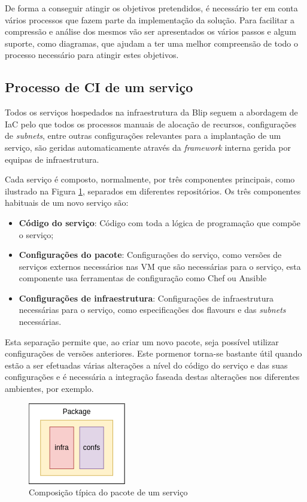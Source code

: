 De forma a conseguir atingir os objetivos pretendidos, é necessário ter em conta vários processos
que fazem parte da implementação da solução. Para facilitar a compressão e análise dos mesmos vão 
ser apresentados os vários passos e algum suporte, como diagramas, que ajudam a ter uma melhor 
compreensão de todo o processo necessário para atingir estes objetivos.

\subsection{Processo de \ac{CI} de um serviço}

Todos os serviços hospedados na infraestrutura da Blip seguem a abordagem de \ac{IaC} pelo que 
todos os processos manuais de alocação de recursos, configurações de \textit{subnets}, entre 
outras configurações relevantes para a implantação de um serviço, são geridas automaticamente
através da \textit{framework} interna gerida por equipas de infraestrutura.

Cada serviço é composto, normalmente, por três componentes principais, como ilustrado na Figura
\ref{package}, separados em diferentes repositórios. Os três componentes habituais de um novo 
serviço são: 

\begin{itemize}
  \item \textbf{Código do serviço}: Código com toda a lógica de programação que compõe o serviço;
  \item \textbf{Configurações do pacote}: Configurações do serviço, como versões de serviços 
  externos necessários nas \ac{VM} que são necessárias para o serviço, esta componente usa 
ferramentas de configuração como Chef \cite{chef} ou Ansible \cite{ansible} 
  \item \textbf{Configurações de infraestrutura}: Configurações de infraestrutura necessárias para 
    o serviço, como especificações dos \glspl{flavour} e das \textit{subnets} necessárias.
\end{itemize}

Esta separação permite que, ao criar um novo pacote, seja possível utilizar configurações de
versões anteriores. Este pormenor torna-se bastante útil quando estão a ser efetuadas várias
alterações a nível do código do serviço e das suas configurações e é necessária a integração 
faseada destas alterações nos diferentes ambientes, por exemplo.

\begin{figure}[H]
  \centerline{\includegraphics[scale=1.2]{media/content/impl/package.png}}
  \caption{Composição típica do pacote de um serviço}
  \label{package}
\end{figure}

